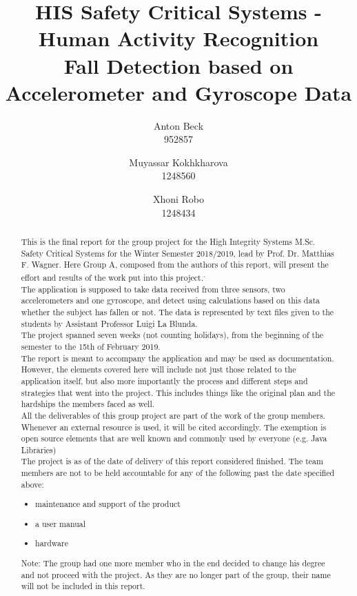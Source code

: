 \documentclass[hidelinks,conference,12pt]{IEEETran}
\title{HIS Safety Critical Systems - Human Activity Recognition \\ Fall Detection based on Accelerometer and Gyroscope Data}
\author{
	 Anton Beck \\ 952857
\and Muyassar Kokhkharova \\ 1248560
\and Xhoni Robo \\ 1248434
}
\begin{document}
\maketitle

\begin{abstract}

This is the final report for the group project for the High Integrity Systems M.Sc. Safety Critical Systems for the Winter Semester 2018/2019, lead by Prof. Dr. Matthias F. Wagner. Here Group A, composed from the authors of this report, will present the effort and results of the work put into this project.\textsuperscript.\\
The application is supposed to take data received from three sensors, two accelerometers and one gyroscope, and detect using calculations based on this data whether the subject has fallen or not. The data is represented by text files given to the students by Assistant Professor Luigi La Blunda.{\cite{lablunda}}\\
The project spanned seven weeks (not counting holidays), from the beginning of the semester to the 15th of February 2019.\\
The report is meant to accompany the application and may be used as documentation. However, the elements covered here will include not just those related to the application itself, but also more importantly the process and different steps and strategies that went into the project. This includes things like the original plan and the hardships the members faced as well.\\
All the deliverables of this group project are part of the work of the group members. Whenever an external resource is used, it will be cited accordingly. The exemption is open source elements that are well known and commonly used by everyone (e.g. Java Libraries)\\
The project is as of the date of delivery of this report considered finished. The team members are not to be held accountable for any of the following past the date specified above:
\begin{itemize}
	\item maintenance and support of the product
	\item a user manual
	\item hardware
\end{itemize}
Note: The group had one more member who in the end decided to change his degree and not proceed with the project. As they are no longer part of the group, their name will not be included in this report. 	
\end{abstract}
\end{document}
